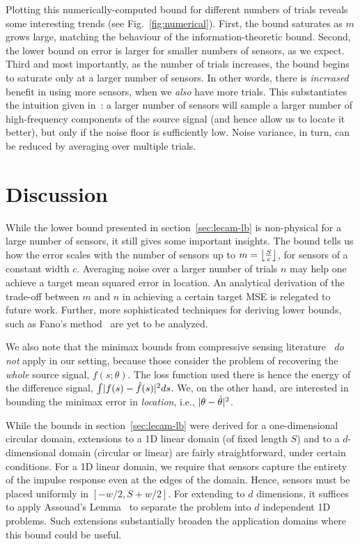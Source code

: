 \documentclass[conference,letterpaper]{IEEEtran}
\DeclarePairedDelimiter\abs{\lvert}{\rvert}
\DeclarePairedDelimiter\floor{\lfloor}{\rfloor}
\begin{document}
Plotting this numerically-computed bound for different numbers of trials
reveals some interesting trends (see Fig.~\ref{fig:numerical}). First, the
bound saturates as $m$ grows large, matching the behaviour of the
information-theoretic bound. Second, the lower bound on error is larger for
smaller numbers of sensors, as we expect. Third and most importantly, as the
number of trials increases, the bound begins to saturate only at a larger
number of sensors. In other words, there is \emph{increased} benefit in using
more sensors, when we \emph{also} have more trials. This substantiates the
intuition given in~\cite{Grover2016Information}: a larger number of sensors
will sample a larger number of high-frequency components of the source signal
(and hence allow us to locate it better), but only if the noise floor is
sufficiently low. Noise variance, in turn, can be reduced by averaging over
multiple trials.

\section{Discussion}
\label{sec:discussion}

While the lower bound presented in section~\ref{sec:lecam-lb} is non-physical
for a large number of sensors, it still gives some important insights.  The
bound tells us how the error scales with the number of sensors up to $m =
\floor*{\frac{S}{c}}$, for sensors of a constant width $c$. Averaging noise
over a larger number of trials $n$ may help one achieve a target mean squared
error in location. An analytical derivation of the trade-off between $m$ and
$n$ in achieving a certain target MSE is relegated to future work. Further,
more sophisticated techniques for deriving lower bounds, such as Fano's
method~\cite[Sec.~2.7.1]{Tsybakov2009Introduction} are yet to be analyzed.

We also note that the minimax bounds from compressive sensing
literature~\cite{AriasCastro2013Fundamental} \emph{do not} apply in our
setting, because those consider the problem of recovering the \emph{whole}
source signal, $f(s;\theta)$. The loss function used there is hence the energy
of the difference signal, $\int \abs{f(s) - \hat f(s)}^2 ds$. We, on the other
hand, are interested in bounding the minimax error in \emph{location}, i.e.,
$\abs{\theta - \hat\theta}^2$.

While the bounds in section~\ref{sec:lecam-lb} were derived for a
one-dimensional circular domain, extensions to a 1D linear domain (of fixed
length $S$) and to a $d$-dimensional domain (circular or linear) are fairly
straightforward, under certain conditions. For a 1D linear domain, we require
that sensors capture the entirety of the impulse response even at the edges of
the domain. Hence, sensors must be placed uniformly in $[-w/2, S{+}w/2]$. For
extending to $d$ dimensions, it suffices to apply Assouad's
Lemma~\cite[Sec.~2.7.2]{Tsybakov2009Introduction} to separate the problem into
$d$ independent 1D problems. Such extensions substantially broaden the
application domains where this bound could be useful.
\end{document}
